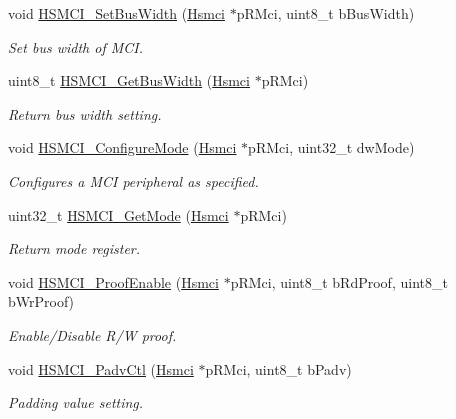 \begin{DoxyCompactItemize}
void \mbox{\hyperlink{group__hsmci__functions_ga402f687cf0393baac08390e517e84033}{H\+S\+M\+C\+I\+\_\+\+Set\+Bus\+Width}} (\mbox{\hyperlink{structHsmci}{Hsmci}} $\ast$p\+R\+Mci, uint8\+\_\+t b\+Bus\+Width)
\begin{DoxyCompactList}\small\item\em Set bus width of M\+CI. \end{DoxyCompactList}\item 
uint8\+\_\+t \mbox{\hyperlink{group__hsmci__functions_ga552236fa96bc93916c7f87d3d1fd420f}{H\+S\+M\+C\+I\+\_\+\+Get\+Bus\+Width}} (\mbox{\hyperlink{structHsmci}{Hsmci}} $\ast$p\+R\+Mci)
\begin{DoxyCompactList}\small\item\em Return bus width setting. \end{DoxyCompactList}\item 
void \mbox{\hyperlink{group__hsmci__functions_gaf51e5a4c668bd49302fbab8329215445}{H\+S\+M\+C\+I\+\_\+\+Configure\+Mode}} (\mbox{\hyperlink{structHsmci}{Hsmci}} $\ast$p\+R\+Mci, uint32\+\_\+t dw\+Mode)
\begin{DoxyCompactList}\small\item\em Configures a M\+CI peripheral as specified. \end{DoxyCompactList}\item 
uint32\+\_\+t \mbox{\hyperlink{group__hsmci__functions_ga016a1f6f3a075807c55a2ad2cf23255a}{H\+S\+M\+C\+I\+\_\+\+Get\+Mode}} (\mbox{\hyperlink{structHsmci}{Hsmci}} $\ast$p\+R\+Mci)
\begin{DoxyCompactList}\small\item\em Return mode register. \end{DoxyCompactList}\item 
void \mbox{\hyperlink{group__hsmci__functions_ga7bf994f02c7a9184148767df93b74360}{H\+S\+M\+C\+I\+\_\+\+Proof\+Enable}} (\mbox{\hyperlink{structHsmci}{Hsmci}} $\ast$p\+R\+Mci, uint8\+\_\+t b\+Rd\+Proof, uint8\+\_\+t b\+Wr\+Proof)
\begin{DoxyCompactList}\small\item\em Enable/\+Disable R/W proof. \end{DoxyCompactList}\item 
void \mbox{\hyperlink{group__hsmci__functions_ga8f832162c274c87351c980033d382c9d}{H\+S\+M\+C\+I\+\_\+\+Padv\+Ctl}} (\mbox{\hyperlink{structHsmci}{Hsmci}} $\ast$p\+R\+Mci, uint8\+\_\+t b\+Padv)
\begin{DoxyCompactList}\small\item\em Padding value setting. \end{DoxyCompactList}\item 

\end{DoxyCompactItemize}
